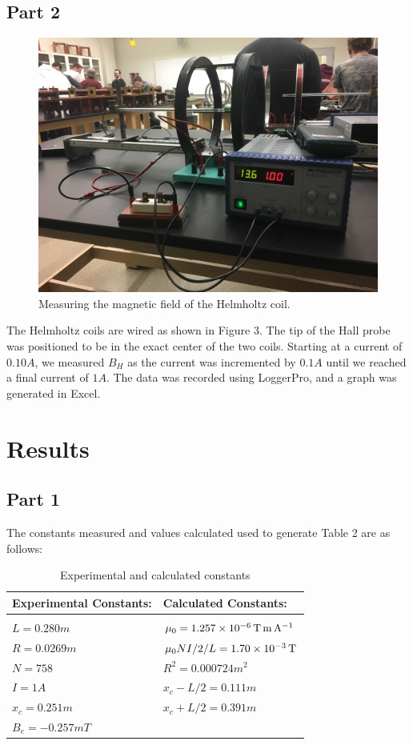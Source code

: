 \documentclass[letterpaper]{article}
\begin{document}
\subsection{Part 2}

\begin{figure}[H]
    \centering
    \includegraphics[width=.6\textwidth]{p2-3.jpg}
    \caption{Measuring the magnetic field of the Helmholtz coil.}
\end{figure}
The Helmholtz coils are wired as shown in Figure 3. The tip of the Hall probe
was positioned to be in the exact center of the two coils. Starting at a current
of $0.10 A$, we measured $B_H$ as the current was incremented by $0.1 A$ until
we reached a final current of $1A$. The data was recorded using LoggerPro, and
a graph was generated in Excel.


\section{Results}

\subsection{Part 1}

The constants measured and values calculated used to generate Table 2 are
as follows:

\begin{table}[H]
\centering
\begin{tabular}{ll}
Experimental Constants: & Calculated Constants:     \\ \hline
                        &                           \\
$L =0.280m$             & $\mu_0 =\SI{1.257E-06}{\tesla \metre \per \ampere}$   \\
$R =0.0269m$            & $\mu_0 N I/2/L = \SI{1.70E-03}{\tesla}$ \\
$N = 758$               & $R^2 =0.000724m^2$        \\
$I =1A$                 & $x_c - L/2 =0.111m$       \\
$x_c = 0.251m$          & $x_c + L/2 = 0.391m$      \\
$B_e = -0.257mT$        &                           \\
\end{tabular}
\caption{Experimental and calculated constants}
\end{table}
\end{document}
